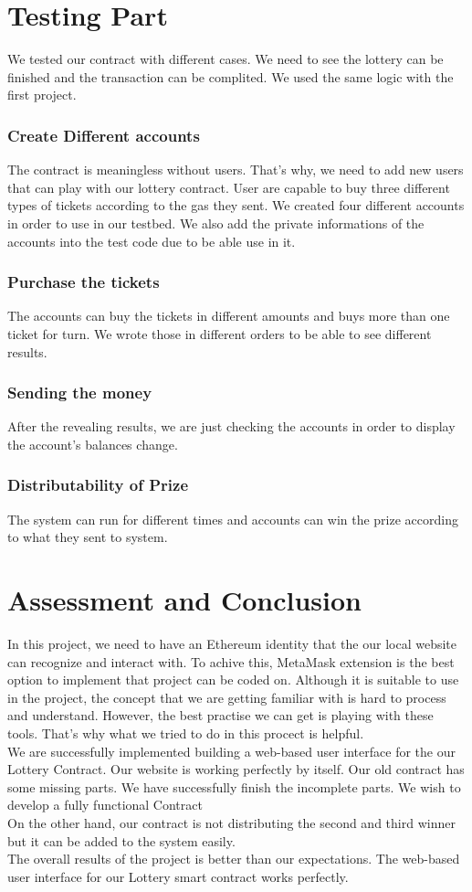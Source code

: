 \documentclass[]{scrreprt}
\begin{document}
\chapter{Testing Part}
		We tested our contract with different cases. We need to see the lottery can be finished and the transaction can be complited. We used the same logic with the first project.
		\subsection{Create Different accounts}
		The contract is meaningless without users. That's why, we need to add new users that can play with our lottery contract. User are capable to buy three different types of tickets according to the gas they sent. We created four different accounts in order to use in our testbed. We also add the private informations of the accounts into the test code due to be able use in it.
		\subsection{Purchase the tickets}
		The accounts can buy the tickets in different amounts and buys more than one ticket for turn. We wrote  those in different orders to be able to see different results. 
		\subsection{Sending the money}
		After the revealing results, we are just checking the accounts in order to display the account's balances change. 
		\subsection{Distributability of Prize}
		The system can run for different times and accounts can win the prize according to what they sent to system.
\chapter{Assessment and Conclusion}
In this project, we need to have an Ethereum identity that the our local website can recognize and interact with. To achive this,  MetaMask extension is the best option to implement that project can be coded on. Although it is suitable to use in the project, the concept that we are getting familiar with is hard to process and understand. However, the best practise we can get is playing with these tools. That's why what we tried to do in this procect is helpful.\\
We are successfully implemented building a web-based user interface for the our Lottery Contract. Our website is working perfectly by itself. Our old contract has some missing parts. We have successfully finish the incomplete parts. We wish to develop a fully functional Contract \\
On the other hand, our contract is not distributing the second and third winner but it can be added to the system easily.\\
The overall results of the project is better than our expectations. The web-based user interface for our Lottery smart contract works perfectly.
\end{document}
